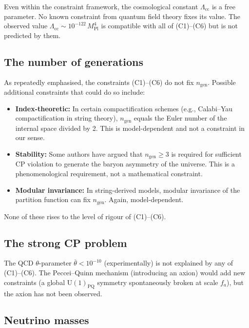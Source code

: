 \documentclass[12pt]{article}
\theoremstyle{definition}
\theoremstyle{remark}
\newcommand{\UU}{\mathrm{U}}
\begin{document}
Even within the constraint framework, the cosmological constant
$\Lambda_{\mathrm{cc}}$ is a free parameter.  No known constraint
from quantum field theory fixes its value.  The observed value
$\Lambda_{\mathrm{cc}} \sim 10^{-122}\,M_{\mathrm{Pl}}^4$ is
compatible with all of (C1)--(C6) but is not predicted by them.

\subsection{The number of generations}

As repeatedly emphasised, the constraints (C1)--(C6) do not fix
$n_{\mathrm{gen}}$.  Possible additional constraints that could
do so include:
\begin{itemize}
\item \textbf{Index-theoretic:} In certain compactification
  schemes (e.g., Calabi--Yau compactification in string theory),
  $n_{\mathrm{gen}}$ equals the Euler number of the internal space
  divided by 2.  This is model-dependent and not a constraint in
  our sense.
\item \textbf{Stability:} Some authors have argued that
  $n_{\mathrm{gen}} \geq 3$ is required for sufficient CP violation
  to generate the baryon asymmetry of the universe.  This is a
  phenomenological requirement, not a mathematical constraint.
\item \textbf{Modular invariance:} In string-derived models,
  modular invariance of the partition function can fix
  $n_{\mathrm{gen}}$.  Again, model-dependent.
\end{itemize}

None of these rises to the level of rigour of (C1)--(C6).

\subsection{The strong CP problem}

The QCD $\theta$-parameter $\bar{\theta} < 10^{-10}$
(experimentally) is not explained by any of (C1)--(C6).
The Peccei--Quinn mechanism (introducing an axion) would
add new constraints (a global $\UU(1)_{\mathrm{PQ}}$ symmetry
spontaneously broken at scale $f_a$), but the axion has not
been observed.

\subsection{Neutrino masses}
\end{document}
